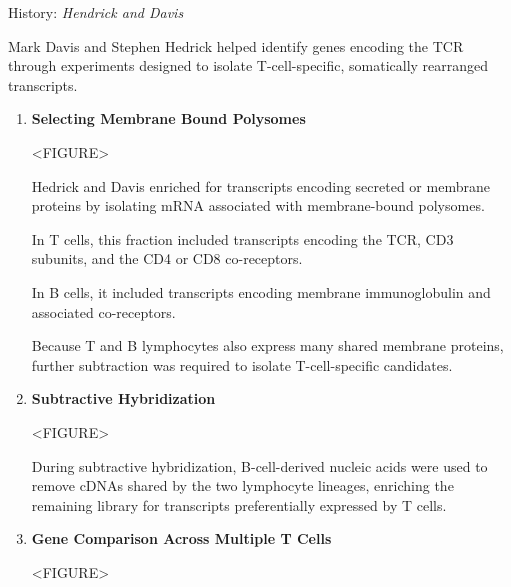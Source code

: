       \begin{core}{History: \textit{Hendrick and Davis}}

        Mark Davis and Stephen Hedrick helped identify genes encoding the TCR through experiments designed to isolate T-cell-specific, somatically rearranged transcripts.

        \begin{enumerate}[label=(\arabic*)]

          \item \textbf{Selecting Membrane Bound Polysomes}

            <FIGURE>

            Hedrick and Davis enriched for transcripts encoding secreted or membrane proteins by isolating mRNA associated with membrane-bound polysomes.

            In T cells, this fraction included transcripts encoding the TCR, CD3 subunits, and the CD4 or CD8 co-receptors.

            In B cells, it included transcripts encoding membrane immunoglobulin and associated co-receptors.

            Because T and B lymphocytes also express many shared membrane proteins, further subtraction was required to isolate T-cell-specific candidates.

          \item \textbf{Subtractive Hybridization}

            <FIGURE>

            During subtractive hybridization, B-cell-derived nucleic acids were used to remove cDNAs shared by the two lymphocyte lineages, enriching the remaining library for transcripts preferentially expressed by T cells.

          \item \textbf{Gene Comparison Across Multiple T Cells}

            <FIGURE>


\end{enumerate}
\end{core}
